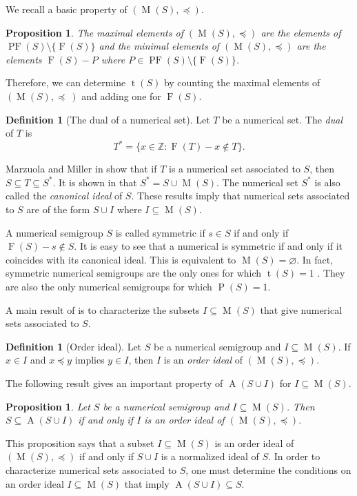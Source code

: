 \documentclass{amsproc}
\newcommand{\Z}{\mathbb{Z}}
\DeclareMathOperator{\F}{F}
\DeclareMathOperator{\PF}{PF}
\DeclareMathOperator{\Pa}{P}
\DeclareMathOperator{\type}{t}
\DeclareMathOperator{\A}{A}
\DeclareMathOperator{\M}{M}
\newtheorem{prop}[theorem]{Proposition}
\theoremstyle{definition}
\newtheorem{definition}[theorem]{Definition}
\theoremstyle{remark}
\numberwithin{equation}{section}
\begin{document}
We recall a basic property of $(\M(S),\preccurlyeq)$.  
\begin{prop}\cite[Lemma 2.1 and Proposition 2.2]{chen2023enumeratingnumericalsetsassociated}\label{prop:max_min_elements}
The maximal elements of $(\M(S),\preccurlyeq)$ are the elements of $\PF(S) \setminus \{\F(S)\}$ and the minimal elements of $(\M(S),\preccurlyeq)$ are the elements $\F(S) - P$ where $P \in \PF(S) \setminus \{\F(S)\}$.
\end{prop}
Therefore, we can determine $\type(S)$ by counting the maximal elements of $(\M(S),\preccurlyeq~)$ and adding one for $\F(S)$.

\begin{definition}[The dual of a numerical set]
Let $T$ be a numerical set.  The \emph{dual} of $T$ is 
\[
T^* = \{x\in \Z \colon \F(T) - x\not\in T\}.
\]
\end{definition}
Marzuola and Miller in \cite[Proposition 1]{MarzuolaMiller} show that if $T$ is a numerical set associated to $S$, then $S \subseteq T \subseteq S^*$. It is shown in \cite[Lemma 3]{CONSTANTIN201799} that $S^* = S \cup \M(S)$.
The numerical set $S^*$ is also called the \emph{canonical ideal} of $S$. These results imply that numerical sets associated to $S$ are of the form $S \cup I$ where $I \subseteq \M(S)$.  

A numerical semigroup $S$ is called symmetric if $s\in S$ if and only if $\F(S)-s\notin S$. It is easy to see that a numerical is symmetric if and only if it coincides with its canonical ideal. This is equivalent to $\M(S)=\varnothing$. In fact, symmetric numerical semigroups are the only ones for which $\type(S)=1$ \cite{Fröberg198663}. They are also the only numerical semigroups for which $\Pa(S)=1$.

A main result of \cite{chen2023enumeratingnumericalsetsassociated} is to characterize the subsets $I\subseteq \M(S)$ that give numerical sets associated to $S$.

\begin{definition}[Order ideal]
    Let $S$ be a numerical semigroup and $I \subseteq \M(S)$. If $x \in I$ and $x \preccurlyeq y$ implies $y \in I$, then $I$ is an \emph{order ideal} of $(\M(S),\preccurlyeq)$.
\end{definition}

The following result gives an important property of $\A(S\cup I)$ for $I \subseteq \M(S)$.

\begin{prop}\cite[Proposition 2.4]{chen2023enumeratingnumericalsetsassociated}
\label{semigroup subset}
    Let $S$ be a numerical semigroup and $I \subseteq \M(S)$. Then $S \subseteq \A(S\cup I)$ if and only if $I$ is an order ideal of $(\M(S), \preccurlyeq)$.
\end{prop}
This proposition says that a subset $I\subseteq \M(S)$ is an order ideal of $(\M(S),\preccurlyeq)$ if and only if $S\cup I$ is a normalized ideal of $S$. In order to characterize numerical sets associated to $S$, one must determine the conditions on an order ideal $I \subseteq \M(S)$ that imply $\A(S\cup I) \subseteq S$.
\end{document}
